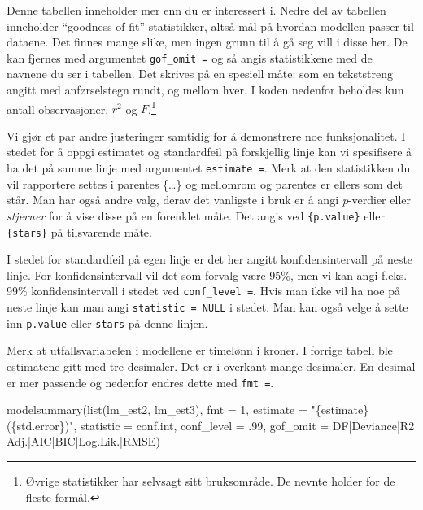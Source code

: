 \documentclass[
  letterpaper,
  DIV=11,
  numbers=noendperiod]{scrreprt}
\newenvironment{Shaded}{\begin{snugshade}}{\end{snugshade}}
\newcommand{\AttributeTok}[1]{\textcolor[rgb]{0.40,0.45,0.13}{#1}}
\newcommand{\DecValTok}[1]{\textcolor[rgb]{0.68,0.00,0.00}{#1}}
\newcommand{\FunctionTok}[1]{\textcolor[rgb]{0.28,0.35,0.67}{#1}}
\newcommand{\NormalTok}[1]{\textcolor[rgb]{0.00,0.23,0.31}{#1}}
\newcommand{\StringTok}[1]{\textcolor[rgb]{0.13,0.47,0.30}{#1}}
\theoremstyle{definition}
\theoremstyle{remark}
\begin{document}
Denne tabellen inneholder mer enn du er interessert i. Nedre del av
tabellen inneholder ``goodness of fit'' statistikker, altså mål på
hvordan modellen passer til dataene. Det finnes mange slike, men ingen
grunn til å gå seg vill i disse her. De kan fjernes med argumentet
\texttt{gof\_omit\ =} og så angis statistikkene med de navnene du ser i
tabellen. Det skrives på en spesiell måte: som en tekststreng angitt med
anførselstegn rundt, og \texttt{\textbar{}} mellom hver. I koden
nedenfor beholdes kun antall observasjoner, \(r^2\) og \(F\).\footnote{Øvrige
  statistikker har selvsagt sitt bruksområde. De nevnte holder for de
  fleste formål.}

Vi gjør et par andre justeringer samtidig for å demonstrere noe
funksjonalitet. I stedet for å oppgi estimatet og standardfeil på
forskjellig linje kan vi spesifisere å ha det på samme linje med
argumentet \texttt{estimate\ =}. Merk at den statistikken du vil
rapportere settes i parentes \{\ldots\} og mellomrom og parentes er
ellers som det står. Man har også andre valg, derav det vanligste i bruk
er å angi \emph{p}-verdier eller \emph{stjerner} for å vise disse på en
forenklet måte. Det angis ved \texttt{\{p.value\}} eller
\texttt{\{stars\}} på tilsvarende måte.

I stedet for standardfeil på egen linje er det her angitt
konfidensintervall på neste linje. For konfidensintervall vil det som
forvalg være 95\%, men vi kan angi f.eks. 99\% konfidensintervall i
stedet ved \texttt{conf\_level\ =}. Hvis man ikke vil ha noe på neste
linje kan man angi \texttt{statistic\ =\ NULL} i stedet. Man kan også
velge å sette inn \texttt{p.value} eller \texttt{stars} på denne linjen.

Merk at utfallsvariabelen i modellene er timelønn i kroner. I forrige
tabell ble estimatene gitt med tre desimaler. Det er i overkant mange
desimaler. En desimal er mer passende og nedenfor endres dette med
\texttt{fmt\ =}.

\begin{Shaded}
\begin{Highlighting}[]
\FunctionTok{modelsummary}\NormalTok{(}\FunctionTok{list}\NormalTok{(lm\_est2, lm\_est3), }
             \AttributeTok{fmt =} \DecValTok{1}\NormalTok{,}
             \AttributeTok{estimate =} \StringTok{"\{estimate\} (\{std.error\})"}\NormalTok{,}
             \AttributeTok{statistic =} \StringTok{\textquotesingle{}conf.int\textquotesingle{}}\NormalTok{, }
             \AttributeTok{conf\_level =}\NormalTok{ .}\DecValTok{99}\NormalTok{, }
             \AttributeTok{gof\_omit =} \StringTok{\textquotesingle{}DF|Deviance|R2 Adj.|AIC|BIC|Log.Lik.|RMSE\textquotesingle{}}\NormalTok{)}
\end{Highlighting}
\end{Shaded}
\end{document}
